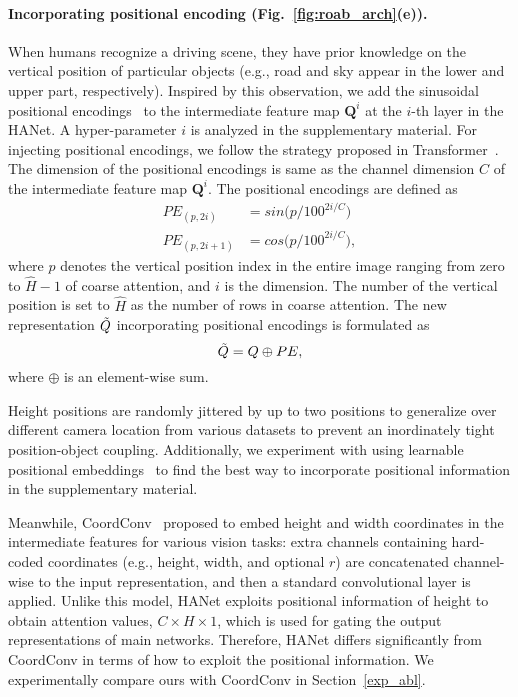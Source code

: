 \documentclass[10pt,twocolumn,letterpaper]{article}
\begin{document}
\paragraph{Incorporating positional encoding (Fig.~\ref{fig:roab_arch}(e)).}
\vspace*{-0.3cm}
When humans recognize a driving scene, they have 
prior knowledge on the vertical position of particular objects
(e.g., road and sky appear in the lower and upper part, respectively). Inspired by this observation, we add the sinusoidal positional encodings~\cite{vaswani2017attention} to the intermediate feature map $\mathbf{Q}^i$ at the $i$-th layer in the HANet. A hyper-parameter $i$ is analyzed in the supplementary material.
For injecting positional encodings, we follow the strategy proposed in Transformer~\cite{vaswani2017attention}. The dimension of the positional encodings is same as the channel dimension $C$ of the intermediate feature map $\mathbf{Q}^i$. The positional encodings are defined as
\vspace*{-0.1cm}
\begin{align*}
    PE_{(p, 2i)}&=sin\big(p/100^{2i/C}\big)\\
    PE_{(p, 2i+1)}&=cos\big(p/100^{2i/C}\big),
\end{align*}
where $p$ denotes the vertical position index in the entire image ranging from zero to $\hat{H}-1$ of coarse attention, and $i$ is the dimension. 
The number of 
the vertical position is set to $\hat{H}$ as the number of rows in coarse attention. The new representation $\Tilde{Q}$ incorporating positional encodings is formulated as
\begin{equation}
    \Tilde{Q}=Q\oplus PE,
\end{equation}
where $\oplus$ is 
an element-wise sum.

Height positions are randomly jittered by up to two positions to generalize over different camera location from various datasets to prevent an inordinately tight position-object coupling. Additionally, we experiment with using learnable positional embeddings~\cite{gehring2017convolutional} to find the best way to incorporate positional information in the supplementary material.

Meanwhile, CoordConv~\cite{liu2018intriguing} proposed to embed height and width coordinates in the intermediate features for various vision tasks: extra channels containing hard-coded coordinates (e.g., height, width, and optional $r$) are concatenated channel-wise to the input representation, and then a standard convolutional layer is applied. Unlike this model, HANet exploits positional information of height to obtain attention values, $C\times H \times 1$, which is used for gating the output representations of main networks. Therefore, HANet differs significantly from CoordConv in terms of how to exploit the positional information. We experimentally compare ours with CoordConv in Section~\ref{exp_abl}.
\end{document}
